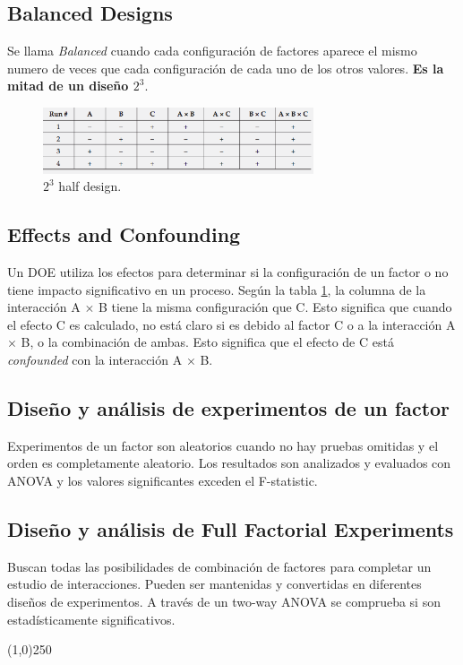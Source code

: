 \documentclass[oneside]{book}
\begin{document}
\subsection{Balanced Designs}
Se llama \textit{Balanced} cuando cada configuración de factores aparece el mismo numero de veces que cada configuración de cada uno de los otros valores. \textbf{Es la mitad de un diseño $2^3$}.

\begin{figure}[H]
	\centering
	\includegraphics[width=80mm]{imagenes/a23halfdesign.png}
	\caption{$2^3$ half design.}
	\label{fig:a23halfdesign}
\end{figure}

\subsection{Effects and Confounding}

Un DOE utiliza los efectos para determinar si la configuración de un factor o no tiene impacto significativo en un proceso. 
Según la tabla \ref{fig:a23halfdesign}, la columna de la interacción A $\times$ B tiene la misma configuración que C. Esto significa que cuando el efecto C es calculado, no está claro si es debido al factor C o a la interacción A $\times$ B, o la combinación de ambas. Esto significa que el efecto de C está \textit{confounded} con la interacción A $\times$ B.

\subsection{Diseño y análisis de experimentos de un factor}
Experimentos de un factor son aleatorios cuando no hay pruebas omitidas y el orden es completamente aleatorio. Los resultados son analizados y evaluados con ANOVA y los valores significantes exceden el F-statistic.
\subsection{Diseño y análisis de Full Factorial Experiments}
Buscan todas las posibilidades de combinación de factores para completar un estudio de interacciones. Pueden ser mantenidas y convertidas en diferentes diseños de experimentos. A través de un two-way ANOVA se comprueba si son estadísticamente significativos.
\begin{center}
	\line(1,0){250}
\end{center}
\end{document}
